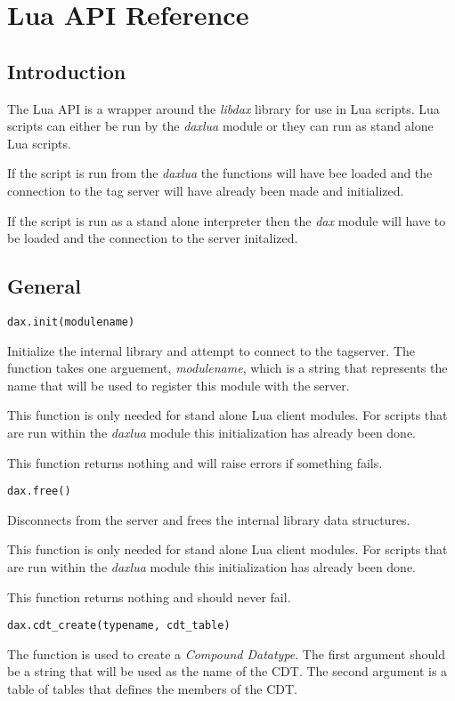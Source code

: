 \chapter{Lua API Reference}
\section{Introduction}
The Lua API is a wrapper around the \textit{libdax} library for use in Lua scripts.  Lua scripts can either be run by the \textit{daxlua} module or they can run as stand alone Lua scripts.

If the script is run from the \textit{daxlua} the functions will have bee loaded and the connection to the tag server will have already been made and initialized.

If the script is run as a stand alone interpreter then the \textit{dax} module will have to be loaded and the connection to the server initalized.

\section{General}

\begin{verbatim}
dax.init(modulename)
\end{verbatim}
Initialize the internal library and attempt to connect to the tagserver.  The function takes one arguement, \textit{modulename}, which is a string that represents the name that will be used to register this module with the server.

This function is only needed for stand alone Lua client modules.  For scripts that are run within the \textit{daxlua} module this initialization has already been done.

This function returns nothing and will raise errors if something fails.
\begin{verbatim}
dax.free()
\end{verbatim}
Disconnects from the server and frees the internal library data structures.

This function is only needed for stand alone Lua client modules.  For scripts that are run within the \textit{daxlua} module this initialization has already been done.

This function returns nothing and should never fail.
\begin{verbatim}
dax.cdt_create(typename, cdt_table)
\end{verbatim}
The function is used to create a \textit{Compound Datatype}.  The first argument should be a string that will be used as the name of the CDT.  The second argument is a table of tables that defines the members of the CDT.

